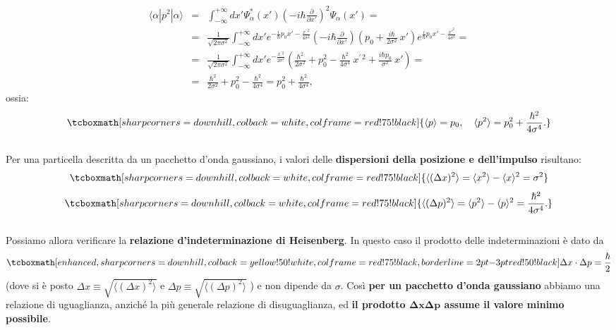 	\begin{eqnarray}
		\langle \alpha | p^2 | \alpha \rangle  &=& \int_{-\infty}^{+\infty} dx' \Psi ^* _\alpha(x') \left(-i \hbar \frac{\partial}{\partial x'} \right)^2 \Psi_\alpha(x') = \nonumber \\
		&=& \frac{1}{\sqrt{2 \pi \sigma^2}} \int_{-\infty}^{+\infty} dx' e^{-\frac{i}{\hbar}p_0 x' - \frac{x^{\prime \,2}}{4 \sigma^2}} \left(-i \hbar \frac{\partial}{\partial x'} \right)\left(p_0 + \frac{i \hbar}{2 \sigma^2} ~x' \right) e^{\frac{i}{\hbar}p_0 x' - \frac{x'^2}{4 \sigma^2}} = \nonumber \\
		&=& \frac{1}{\sqrt{2 \pi \sigma^2}} \int_{-\infty}^{+\infty} dx'  e^{- \frac{x^{\prime \,2}}{2 \sigma^2}} \left(\frac{\hbar^2}{2 \sigma^2} + p_0^2 - \frac{\hbar^2}{4 \sigma^4}~x^{\prime \,2} + \frac{i \hbar p_0}{\sigma^2}~x' \right) = \nonumber \\
		&=& \frac{\hbar^2}{2 \sigma^2} + p_0^2 - \frac{\hbar^2}{4 \sigma^4} = p_0^2 + \frac{\hbar^2}{4 \sigma^4},
\end{eqnarray}
ossia:
	\begin{equation}
		\tcboxmath[sharp corners=downhill ,colback=white,colframe=red!75!black]{
			\langle p \rangle = p_0, \quad \langle p^2 \rangle = p_0^2 + \frac{\hbar^2}{4 \sigma^4}.
			}
	\end{equation}\\
	
Per una particella descritta da un pacchetto d'onda gaussiano, i valori delle \textbf{dispersioni della posizione e dell'impulso} risultano:
	\begin{equation}
		\tcboxmath[sharp corners=downhill ,colback=white,colframe=red!75!black]{
		\langle (\Delta x)^2 \rangle = \langle x^2 \rangle - \langle x \rangle^2 = \sigma^2
		}
	\end{equation}
	\begin{equation}
		\tcboxmath[sharp corners=downhill ,colback=white,colframe=red!75!black]{
			\langle (\Delta p)^2 \rangle = \langle p^2 \rangle - \langle p \rangle^2 =  \frac{\hbar^2}{4 \sigma^4}.
			}
	\end{equation}\\
	
Possiamo allora verificare la \textbf{relazione d'indeterminazione di Heisenberg}. In questo caso il prodotto delle indeterminazioni è dato da
	\begin{equation}
		\tcboxmath[enhanced,sharp corners=downhill ,colback=yellow!50!white,colframe=red!75!black, borderline={2pt}{-3pt}{red!50!black}]{
		\Delta x \cdot \Delta p = \frac{\hbar}{2}
		}
	\end{equation}
(dove si è posto $\Delta x \equiv \sqrt{\langle (\Delta x)^2 \rangle}$ e $\Delta p \equiv \sqrt{\langle (\Delta p)^2 \rangle}$ ) e non dipende da $\sigma$. Così \textbf{per un pacchetto d'onda gaussiano} abbiamo una relazione di uguaglianza, anziché la più generale relazione di disuguaglianza, ed \textbf{il prodotto $\mathbf{\Delta x \Delta p}$ assume il valore minimo possibile}.\\

